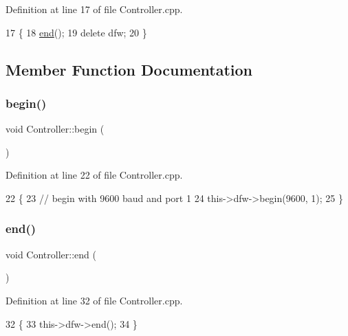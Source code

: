 Definition at line 17 of file Controller.\+cpp.


\begin{DoxyCode}
17                         \{
18     \hyperlink{class_controller_aaa374c56ef024a31888ab048baf0219c}{end}();
19     \textcolor{keyword}{delete} dfw;
20 \}
\end{DoxyCode}


\subsection{Member Function Documentation}
\mbox{\label{class_controller_a1cc0b87ab9e07d21ab47d294aa5bf607}} 
\subsubsection{\texorpdfstring{begin()}{begin()}}
{\footnotesize\ttfamily void Controller\+::begin (\begin{DoxyParamCaption}{ }\end{DoxyParamCaption})}



Definition at line 22 of file Controller.\+cpp.


\begin{DoxyCode}
22                        \{
23     \textcolor{comment}{// begin with 9600 baud and port 1}
24     this->dfw->begin(9600, 1);
25 \}
\end{DoxyCode}
\mbox{\label{class_controller_aaa374c56ef024a31888ab048baf0219c}} 
\subsubsection{\texorpdfstring{end()}{end()}}
{\footnotesize\ttfamily void Controller\+::end (\begin{DoxyParamCaption}{ }\end{DoxyParamCaption})}



Definition at line 32 of file Controller.\+cpp.


\begin{DoxyCode}
32                      \{
33     this->dfw->end();
34 \}
\end{DoxyCode}
\mbox{\label{class_controller_a4162841dc8e34bffaff972c725f162cc}} 
